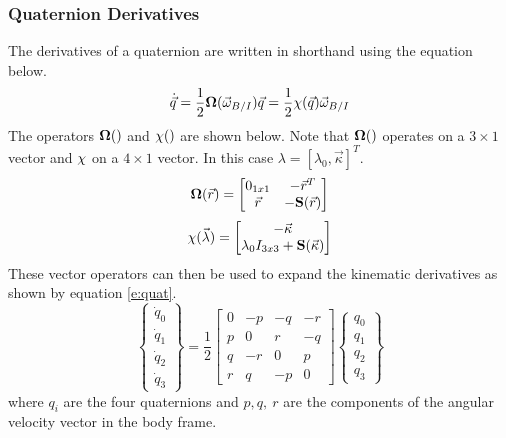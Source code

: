 \documentclass{article}
\begin{document}
\subsubsection{Quaternion Derivatives}

The derivatives of a quaternion are written in shorthand using the
equation below. 
\begin{equation}
  \dot{\vec{q}} = \frac{1}{2}{\bf \Omega}(\vec{\omega}_{B/I})\vec{q} =
  \frac{1}{2}{\bf \chi}(\vec{q})\vec{\omega}_{B/I}
\end{equation}
The operators ${\bf \Omega}()$ and ${\bf \chi}()$ are shown below. Note that
${\bf \Omega}()$ operates on a $3 \times 1$ vector and ${\bf \chi}$ on a $4 \times 1$ vector.
In this case $\lambda = [\lambda_0,\vec{\kappa}]^T$.
\begin{equation}
  {\bf \Omega}(\vec{r}) = \begin{bmatrix} 0_{1x1} & -\vec{r}^T \\ \vec{r} &
    -{\bf S}(\vec{r})\end{bmatrix}
\end{equation}
\begin{equation}
  {\bf \chi}(\vec{\lambda}) = \begin{bmatrix} -\vec{\kappa}
    \\ \lambda_0I_{3x3} + {\bf S}(\vec{\kappa}) \end{bmatrix}
\end{equation}
These vector operators can then be used to expand the kinematic
derivatives as shown by equation \ref{e:quat}.
\begin{equation}\label{e:quat}
  \begin{Bmatrix} \dot{q}_{0} \\ \dot{q}_{1} \\ \dot{q}_{2}
    \\ \dot{q}_{3} \end{Bmatrix} = \frac{1}{2} \begin{bmatrix} 0 & -p & -q & -r
    \\ p & 0 & r & -q \\ q & -r & 0 & p \\ r & q & -p & 0 \end{bmatrix} \begin{Bmatrix} q_{0}
    \\ q_{1} \\ q_{2} \\ q_{3} \end{Bmatrix}
\end{equation}
where $q_{i}$ are the four quaternions and $p,q,~r$ are the components
of the angular velocity vector in the body frame.
\end{document}
